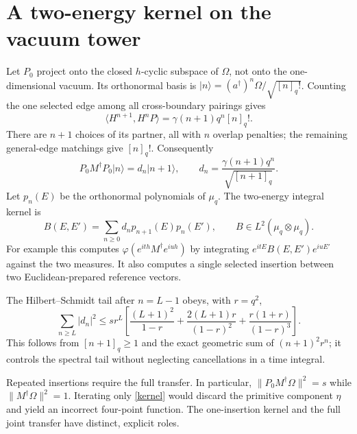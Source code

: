 \documentclass[11pt]{article}
\newcommand{\ph}{\varphi}
\newcommand{\qn}[1]{[#1]_q}
\begin{document}
\newpage
\section{A two-energy kernel on the vacuum tower}
Let $P_0$ project onto the closed $h$-cyclic subspace of $\Omega$,
not onto the one-dimensional vacuum. Its orthonormal basis is
$|n\rangle=(a^\dagger)^n\Omega/\sqrt{\qn n!}$.
Counting the one selected edge among all cross-boundary pairings gives
\begin{equation}
 \langle H^{n+1},H^nP\rangle
       =\gamma(n+1)q^n\qn n!.
\end{equation}
There are $n+1$ choices of its partner, all with $n$ overlap
penalties; the remaining general-edge matchings give $\qn n!$.
Consequently
\begin{equation}\label{compressed}
 P_0M^\dagger P_0|n\rangle=d_n|n+1\rangle,
 \qquad d_n=\frac{\gamma(n+1)q^n}{\sqrt{\qn{n+1}}}.
\end{equation}
Let $p_n(E)$ be the orthonormal polynomials of $\mu_q$.
The two-energy integral kernel is
\begin{equation}\label{kernel}
 B(E,E')=\sum_{n\ge0}d_n p_{n+1}(E)p_n(E'),
 \qquad B\in L^2(\mu_q\otimes\mu_q).
\end{equation}
For example this computes
$\ph(e^{ith}M^\dagger e^{iuh})$ by integrating
$e^{itE}B(E,E')e^{iuE'}$ against the two measures.
It also computes a single selected insertion between two
Euclidean-prepared reference vectors.

The Hilbert--Schmidt tail after $n=L-1$ obeys, with $r=q^2$,
\begin{equation}\label{HStail}
 \sum_{n\ge L}|d_n|^2\le
 s r^L\left[\frac{(L+1)^2}{1-r}
       +\frac{2(L+1)r}{(1-r)^2}
       +\frac{r(1+r)}{(1-r)^3}\right].
\end{equation}
This follows from $\qn{n+1}\ge1$ and the exact geometric
sum of $(n+1)^2r^n$; it controls the spectral tail without
neglecting cancellations in a time integral.

Repeated insertions require the full transfer. In particular,
$\|P_0M^\dagger\Omega\|^2=s$ while
$\|M^\dagger\Omega\|^2=1$. Iterating only \eqref{kernel}
would discard the primitive component $\eta$ and yield an
incorrect four-point function. The one-insertion kernel and
the full joint transfer have distinct, explicit roles.

\newpage
\end{document}
